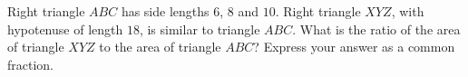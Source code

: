Right triangle $ABC$ has side lengths $6$, $8$ and $10$. Right triangle $XYZ$, with hypotenuse of length $18$, is similar to triangle $ABC$. What is the ratio of the area of triangle $XYZ$ to the area of triangle $ABC$? Express your answer as a common fraction.
